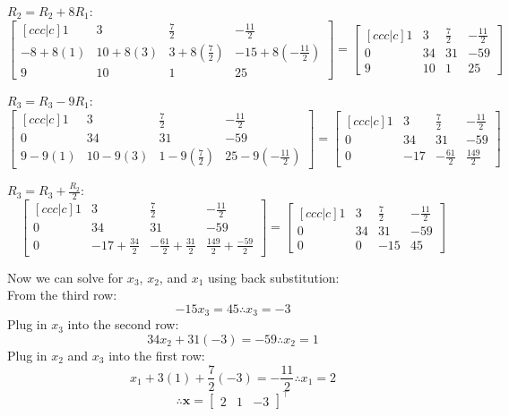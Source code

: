 \documentclass[11pt,letterpaper]{article}
\begin{document}
\begin{enumerate}
\begin{enumerate}
$R_2 = R_2 + 8R_1$:
\[\begin{bmatrix}[ccc|c]
1 & 3 & \frac{7}{2} & -\frac{11}{2} \\
-8 + 8(1) & 10 + 8(3) & 3 + 8(\frac{7}{2}) & -15 + 8(-\frac{11}{2}) \\
9 & 10 & 1 & 25
\end{bmatrix} = 
\begin{bmatrix}[ccc|c]
1 & 3 & \frac{7}{2} & -\frac{11}{2} \\
0 & 34 & 31 & -59 \\
9 & 10 & 1 & 25
\end{bmatrix}\]

$R_3 = R_3 - 9R_1$:
\[\begin{bmatrix}[ccc|c]
1 & 3 & \frac{7}{2} & -\frac{11}{2} \\
0 & 34 & 31 & -59 \\
9 - 9(1) & 10 - 9(3) & 1 - 9(\frac{7}{2}) & 25 - 9(-\frac{11}{2})
\end{bmatrix} =
\begin{bmatrix}[ccc|c]
1 & 3 & \frac{7}{2} & -\frac{11}{2} \\
0 & 34 & 31 & -59 \\
0 & -17 & -\frac{61}{2} & \frac{149}{2}
\end{bmatrix}\]

$R_3 = R_3 + \frac{R_2}{2}$:
\[\begin{bmatrix}[ccc|c]
1 & 3 & \frac{7}{2} & -\frac{11}{2} \\
0 & 34 & 31 & -59 \\
0 & -17 + \frac{34}{2} & -\frac{61}{2} + \frac{31}{2} & \frac{149}{2} + \frac{-59}{2}
\end{bmatrix} =
\begin{bmatrix}[ccc|c]
1 & 3 & \frac{7}{2} & -\frac{11}{2} \\
0 & 34 & 31 & -59 \\
0 & 0 & -15 & 45
\end{bmatrix}\]

Now we can solve for $x_3$, $x_2$, and $x_1$ using back substitution: \\
From the third row:
\[-15x_3 = 45 \therefore x_3 = -3\]
Plug in $x_3$ into the second row:
\[34x_2 + 31(-3) = -59 \therefore x_2 = 1\]
Plug in $x_2$ and $x_3$ into the first row:
\[x_1 + 3(1) + \frac{7}{2}(-3) = -\frac{11}{2} \therefore x_1 = 2\]
\[\therefore \mathbf{x} = \begin{bmatrix} 2 & 1 & -3 \end{bmatrix}^\top\]

\newpage


\end{enumerate}
\end{enumerate}
\end{document}
